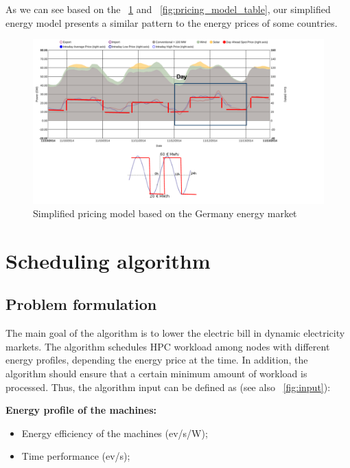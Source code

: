 As we can see based on the ~\ref{fig:pricing_model} and ~\ref{fig:pricing_model_table}, our simplified energy model presents a similar pattern to the energy prices of some countries.

\begin{figure}[h]
  \centering
    \includegraphics[width=150mm]{"img/pricing_model"}
    \caption{Simplified pricing model based on the Germany energy market}
    \label{fig:pricing_model}
\end{figure}

\section{Scheduling algorithm}

\subsection*{Problem formulation}

The main goal of the algorithm is to lower the electric bill in dynamic electricity markets. The algorithm schedules HPC workload among nodes with different energy profiles, depending the energy price at the time. In addition, the algorithm should ensure that a certain minimum amount of workload is processed. Thus, the algorithm input can be defined as (see also ~\ref{fig:input}): 

\vspace{10mm}

\textbf{Energy profile of the machines:}
\begin{itemize}
  \item[] Energy efficiency of the machines (ev/s/W);
  \item[] Time performance (ev/s);
\end{itemize}

